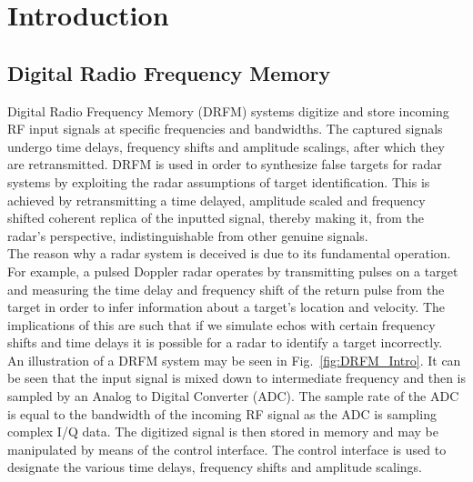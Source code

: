 \section{Introduction}
	\subsection{Digital Radio Frequency Memory}
	\noindent Digital Radio Frequency Memory (DRFM) systems digitize and store incoming RF input signals at specific frequencies and bandwidths. The captured signals undergo time delays, frequency shifts and amplitude scalings, after which they are retransmitted. DRFM is used in order to synthesize false targets for radar systems by exploiting the radar assumptions of target identification. This is achieved by retransmitting a time delayed, amplitude scaled and frequency shifted coherent replica of the inputted signal, thereby making it, from the radar's perspective, indistinguishable from other genuine signals\cite{SJROOME}.\\ \newline The reason why a radar system is deceived is due to its fundamental operation. For example, a pulsed Doppler radar operates by transmitting pulses on a target and measuring the time delay and frequency shift of the return pulse from the target in order to infer information about a target's location and velocity. The implications of this are such that if we simulate echos with certain frequency shifts and time delays it is possible for a radar to identify a target incorrectly.\\ \newline An illustration of a DRFM system may be seen in Fig.~\ref{fig:DRFM_Intro}. It can be seen that the input signal is mixed down to intermediate frequency and then is sampled by an Analog to Digital Converter (ADC). The sample rate of the ADC is equal to the bandwidth of the incoming RF signal as the ADC is sampling complex I/Q data. The digitized signal is then stored in memory and may be manipulated by means of the control interface. The control interface is used to designate the various time delays, frequency shifts and amplitude scalings. 
